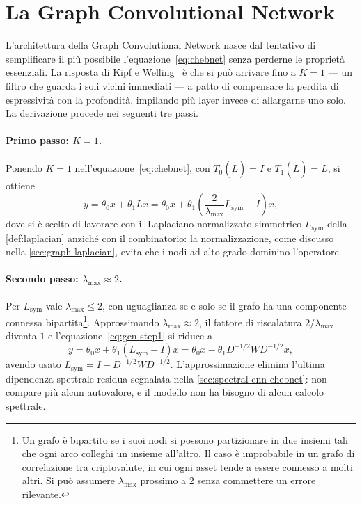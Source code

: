 \section{La Graph Convolutional Network}
\label{sec:gcn-kipf-welling}

L'architettura della Graph Convolutional Network nasce dal tentativo di semplificare il più possibile l'equazione~\eqref{eq:chebnet} senza perderne le proprietà essenziali. La risposta di Kipf e Welling~\cite{kipf2017gcn} è che si può arrivare fino a $K=1$ — un filtro che guarda i soli vicini immediati — a patto di compensare la perdita di espressività con la profondità, impilando più layer invece di allargarne uno solo. La derivazione procede nei seguenti tre passi.

\paragraph{Primo passo: $K=1$.} Ponendo $K=1$ nell'equazione~\eqref{eq:chebnet}, con $T_0(\tilde L)=I$ e $T_1(\tilde L)=\tilde L$, si ottiene
\begin{equation}
\label{eq:gcn-step1}
y = \theta_0 x + \theta_1\tilde Lx = \theta_0x + \theta_1\!\left(\frac{2}{\lambda_{\max}}L_{\mathrm{sym}} - I\right)\!x,
\end{equation}
dove si è scelto di lavorare con il Laplaciano normalizzato simmetrico $L_{\mathrm{sym}}$ della \cref{def:laplacian} anziché con il combinatorio: la normalizzazione, come discusso nella \cref{sec:graph-laplacian}, evita che i nodi ad alto grado dominino l'operatore.

\paragraph{Secondo passo: $\lambda_{\max}\approx2$.} Per $L_{\mathrm{sym}}$ vale $\lambda_{\max}\leq2$, con uguaglianza se e solo se il grafo ha una componente connessa bipartita\footnote{Un grafo è bipartito se i suoi nodi si possono partizionare in due insiemi tali che ogni arco colleghi un insieme all'altro. Il caso è improbabile in un grafo di correlazione tra criptovalute, in cui ogni asset tende a essere connesso a molti altri. Si può assumere $\lambda_{\max}$ prossimo a $2$ senza commettere un errore rilevante.}. Approssimando $\lambda_{\max}\approx2$, il fattore di riscalatura $2/\lambda_{\max}$ diventa $1$ e l'equazione~\eqref{eq:gcn-step1} si riduce a
$$y = \theta_0x + \theta_1(L_{\mathrm{sym}}-I)x = \theta_0x - \theta_1 D^{-1/2}WD^{-1/2}x,$$
avendo usato $L_{\mathrm{sym}} = I - D^{-1/2}WD^{-1/2}$. L'approssimazione elimina l'ultima dipendenza spettrale residua segnalata nella \cref{sec:spectral-cnn-chebnet}: non compare più alcun autovalore, e il modello non ha bisogno di alcun calcolo spettrale.

